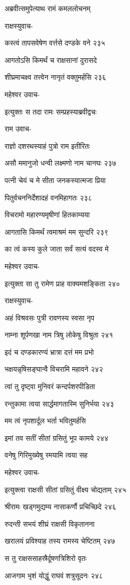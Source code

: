 अब्रवीत्समुपेत्याथ रामं कमललोचनम्

राक्षस्युवाच-

कस्त्वं तापसवेषेण वर्त्तसे दण्डके वने २३५

आगतोऽसि किमर्थं च राक्षसानां दुरासदे

शीघ्रमाचक्ष्व तत्त्वेन नानृतं वक्तुमर्हसि २३६

महेश्वर उवाच-

इत्युक्तः स तदा रामः सम्प्रहस्याब्रवीद्वचः

राम उवाच-

राज्ञो दशरथस्याहं पुत्रो राम इतीरितः

असौ ममानुजो धन्वी लक्ष्मणो नाम चानघः २३७

पत्नी चेयं च मे सीता जनकस्यात्मजा प्रिया

पितुर्वचननिर्देशादहं वनमिहागतः २३८

विचरामो महारण्यमृषीणां हितकाम्यया

आगतासि किमर्थं त्वमाश्रमं मम सुन्दरि २३९

का त्वं कस्य कुले जाता सर्वं सत्यं वदस्व मे

महेश्वर उवाच-

इत्युक्ता सा तु रामेण प्राह वाक्यमशङ्किता २४०

राक्षस्युवाच-

अहं विश्रवसः पुत्री रावणस्य स्वसा नृप

नाम्ना शूर्पणखा नाम त्रिषु लोकेषु विश्रुता २४१

इदं च दण्डकारण्यं भ्रात्रा दत्तं मम प्रभो

भक्षयन्नृषिसङ्घान्वै विचरामि महावने २४२

त्वां तु दृष्ट्वा मुनिवरं कन्दर्पशरपीडिता

रन्तुकामा त्वया सार्द्धमागतास्मि सुनिर्भया २४३

मम त्वं नृपशार्दूल भर्ता भवितुमर्हसि

इमां तव सतीं सीतां ग्रसितुं भूप कामये २४४

वनेषु गिरिमुख्येषु रमयामि त्वया सह

महेश्वर उवाच-

इत्युक्त्वा राक्षसी सीतां ग्रसितुं वीक्ष्य चोद्यताम् २४५

श्रीरामः खड्गमुद्यम्य नासाकर्णौ प्रचिच्छिदे २४६

रुदन्ती सभयं शीघ्रं राक्षसी विकृतानना

खरालयं प्रविश्याह तस्य रामस्य चेष्टितम् २४७

स तु राक्षससाहस्रैर्दूषणत्रिशिरो वृतः

आजगाम भृशं योद्धुं राघवं शत्रुसूदनः २४८

